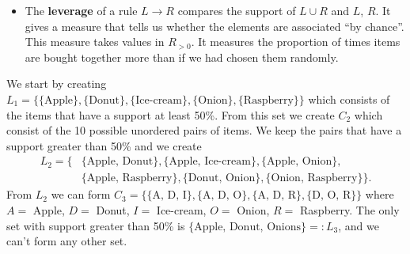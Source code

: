 \documentclass[fontsize=12pt, usenames, dvipsnames, headinclude, headsepline, footinclude, footsepline]{scrartcl}
\renewcommand{\emph}{\textbf}
\begin{document}
\begin{sol}
\begin{itemize}
    \item The \emph{leverage} of a rule $L \to R$ compares the support of $L \cup R$ and $L$, $R$. It gives a
      measure that tells us whether the elements are associated ``by chance''. This measure takes values in
      $R_{>0}$. It measures the proportion of times items are bought together more than if we had chosen them
      randomly. 
    \end{itemize}

    We start by creating
    $L_1 = \{\{\text{Apple}\}, \{\text{Donut}\}, \{\text{Ice-cream}\}, \{\text{Onion}\},
    \{\text{Raspberry}\}\}$ which consists of the items that have a support at least 50\%. From this set we
    create $C_2$ which consist of the 10 possible unordered pairs of items. We keep the pairs that have a
    support greater than 50\% and we create 
    \begin{align*}L_2 = \{&\{\text{Apple, Donut}\}, \{\text{Apple, Ice-cream}\}, \{\text{Apple, Onion}\},\\ & \{\text{Apple,
      Raspberry}\}, \{\text{Donut, Onion}\}, \{\text{Onion, Raspberry}\}\}.\end{align*}
    From $L_2$ we can form $C_3 = \{\{\text{A, D, I}\}, \{\text{A, D, O}\}, \{\text{A, D, R}\}, \{\text{D, O,
      R}\}\}$ where $A = $ Apple, $D = $ Donut, $I = $ Ice-cream, $O = $ Onion, $R = $ Raspberry. The only set
    with support greater than 50\% is $\{\text{Apple, Donut, Onions}\} =: L_3$, and we can't form any other set.
  \end{sol}
\end{document}
